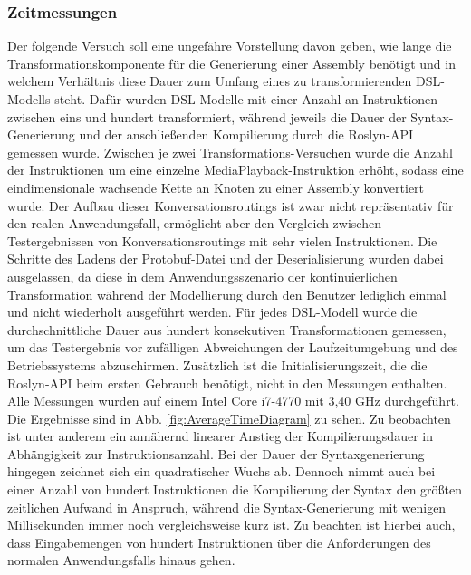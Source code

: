 \subsubsection{Zeitmessungen}
Der folgende Versuch soll eine ungefähre Vorstellung davon geben, wie lange die Transformationskomponente für die Generierung einer Assembly benötigt und in welchem Verhältnis diese Dauer zum Umfang eines zu transformierenden DSL-Modells steht. Dafür wurden DSL-Modelle mit einer Anzahl an Instruktionen zwischen eins und hundert transformiert, während jeweils die Dauer der Syntax-Generierung und der anschließenden Kompilierung durch die Roslyn-API gemessen wurde. Zwischen je zwei Transformations-Versuchen wurde die Anzahl der Instruktionen um eine einzelne MediaPlayback-Instruktion erhöht, sodass eine eindimensionale wachsende Kette an Knoten zu einer Assembly konvertiert wurde. Der Aufbau dieser Konversationsroutings ist zwar nicht repräsentativ für den realen Anwendungsfall, ermöglicht aber den Vergleich zwischen Testergebnissen von Konversationsroutings mit sehr vielen Instruktionen. Die Schritte des Ladens der Protobuf-Datei und der Deserialisierung wurden dabei ausgelassen, da diese in dem Anwendungsszenario der kontinuierlichen Transformation während der Modellierung durch den Benutzer lediglich einmal und nicht wiederholt ausgeführt werden. Für jedes DSL-Modell wurde die durchschnittliche Dauer aus hundert konsekutiven Transformationen gemessen, um das Testergebnis vor zufälligen Abweichungen der Laufzeitumgebung und des Betriebssystems abzuschirmen. Zusätzlich ist die Initialisierungszeit, die die Roslyn-API beim ersten Gebrauch benötigt, nicht in den Messungen enthalten. Alle Messungen wurden auf einem Intel Core i7-4770 mit 3,40 GHz durchgeführt. Die Ergebnisse sind in Abb. \ref{fig:AverageTimeDiagram} zu sehen. 
\newline
Zu beobachten ist unter anderem ein annähernd linearer Anstieg der Kompilierungsdauer in Abhängigkeit zur Instruktionsanzahl. Bei der Dauer der Syntaxgenerierung hingegen zeichnet sich ein quadratischer Wuchs ab. Dennoch nimmt auch bei einer Anzahl von hundert Instruktionen die Kompilierung der Syntax den größten zeitlichen Aufwand in Anspruch, während die Syntax-Generierung mit wenigen Millisekunden immer noch vergleichsweise kurz ist. Zu beachten ist hierbei auch, dass Eingabemengen von hundert Instruktionen über die Anforderungen des normalen Anwendungsfalls hinaus gehen.

